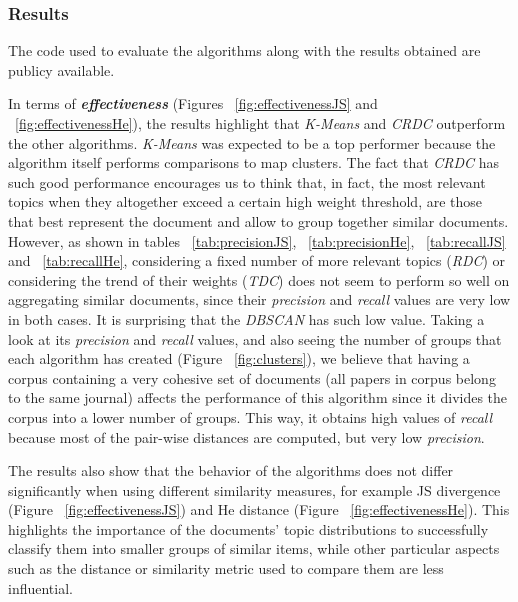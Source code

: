 \subsubsection{Results}

The code used to evaluate the algorithms along with the results obtained are publicy available\citep{Badenes-Olmedo2017a}.

In terms of \textbf{\textit{effectiveness}} (Figures ~\ref{fig:effectivenessJS} and ~\ref{fig:effectivenessHe}), the results highlight that \textit{K-Means} and \textit{CRDC} outperform the other algorithms. \textit{K-Means} was expected to be a top performer because the algorithm itself performs comparisons to map clusters. The fact that \textit{CRDC} has such good performance encourages us to think that, in fact, the most relevant topics when they altogether exceed a certain high weight threshold, are those that best represent the document and allow to group together similar documents. However, as shown in tables ~\ref{tab:precisionJS}, ~\ref{tab:precisionHe}, ~\ref{tab:recallJS} and ~\ref{tab:recallHe}, considering a fixed number of more relevant topics (\textit{RDC}) or considering the trend of their weights (\textit{TDC}) does not seem to perform so well on aggregating similar documents, since their \textit{precision} and \textit{recall} values are very low in both cases. It is surprising that the \textit{DBSCAN} has such low value. Taking a look at its \textit{precision} and \textit{recall} values, and also seeing the number of groups that each algorithm has created (Figure ~\ref{fig:clusters}), we believe that having a corpus containing a very cohesive set of documents (all papers in corpus belong to the same journal) affects the performance of this algorithm since it divides the corpus into a lower number of groups. This way, it obtains high values of \textit{recall} because most of the pair-wise distances are computed, but very low \textit{precision}.

The results also show that the behavior of the algorithms does not differ significantly when using different similarity measures, for example JS divergence (Figure ~\ref{fig:effectivenessJS}) and He distance (Figure ~\ref{fig:effectivenessHe}). This highlights the importance of the documents' topic distributions to successfully classify them into smaller groups of similar items, while other particular aspects such as the distance or similarity metric used to compare them are less influential.

